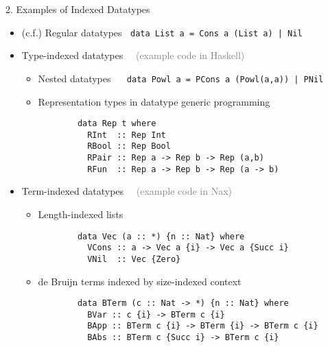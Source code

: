 \documentclass[final]{beamer}
\begin{document}
\begin{frame}[fragile]
\begin{columns}[t]
\begin{column}{.315\linewidth}
\begin{block}{2. Examples of Indexed Datatypes}
\begin{itemize}
\item[]$\!\!\!\!\!\!${\normalsize(c.f.)} Regular datatypes
	$~$ \lstinline!data List a = Cons a (List a) | Nil!
\item Type-indexed datatypes
	$\quad$\textcolor{gray}{\normalsize(example code in Haskell)}
	\begin{itemize}
		\item Nested datatypes $\quad$
			\lstinline!data Powl a = PCons a (Powl(a,a)) | PNil!
		\item Representation types in datatype generic programming
		\begin{lstlisting}
		data Rep t where
		  RInt  :: Rep Int
		  RBool :: Rep Bool
		  RPair :: Rep a -> Rep b -> Rep (a,b)
		  RFun  :: Rep a -> Rep b -> Rep (a -> b)
		\end{lstlisting}
	\end{itemize}
\item Term-indexed datatypes
	$\quad$\textcolor{gray}{\normalsize(example code in Nax)}
	\begin{itemize}
        	\item Length-indexed lists
		\begin{lstlisting}
		data Vec (a :: *) {n :: Nat} where
		  VCons :: a -> Vec a {i} -> Vec a {Succ i}
		  VNil  :: Vec {Zero}
		\end{lstlisting}
		\item de Bruijn terms indexed by size-indexed context
		\begin{lstlisting}
		data BTerm (c :: Nat -> *) {n :: Nat} where
		  BVar :: c {i} -> BTerm c {i}
		  BApp :: BTerm c {i} -> BTerm {i} -> BTerm c {i}
		  BAbs :: BTerm c {Succ i} -> BTerm c {i}
		\end{lstlisting}
	\end{itemize}
\end{itemize} %
\end{block}

\end{column}
\begin{column}{.315\linewidth}


\end{column}
\end{columns}
\end{frame}
\end{document}

